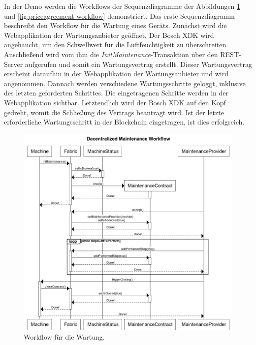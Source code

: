 In der Demo werden die Workflows der Sequenzdiagramme der Abbildungen \ref{fig:maintenance-workflow} und \ref{fig:priceagreement-workflow} demonstriert. Das erste Sequenzdiagramm beschreibt den Workflow für die Wartung eines Geräts. Zunächst wird die Webapplikation der Wartungsanbieter geöffnet. Der Bosch XDK wird angehaucht, um den Schwellwert für die Luftfeuchtigkeit zu überschreiten. Anschließend wird vom ihm die \textit{InitMaintenance}-Transaktion über den REST-Server aufgerufen und somit ein Wartungsvertrag erstellt. Dieser Wartungsvertrag erscheint daraufhin in der Webapplikation der Wartungsanbieter und wird angenommen. Dannach werden verschiedene Wartungsschritte geloggt, inklusive des letzten geforderten Schrittes. Die eingetragenen Schritte werden in der Webapplikation sichtbar. Letztendlich wird der Bosch XDK auf den Kopf gedreht, womit die Schließung des Vertrags beantragt wird. Ist der letzte erforderliche Wartungsschritt in der Blockchain eingetragen, ist dies erfolgreich.

\begin{figure}[!htbp]
    \centering
      \includegraphics[width=1.0\textwidth,angle=0]{images/maintenance-workflow}
       \caption{Workflow für die Wartung.}
      \label{fig:maintenance-workflow}
\end{figure}

